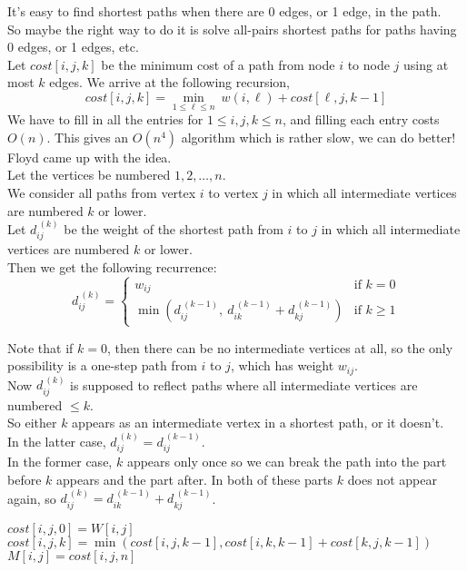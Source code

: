 \documentclass[12pt]{article}
\theoremstyle{plain}
\theoremstyle{definition}
\begin{document}
It's easy to find shortest paths when there are 0 edges, or 1 edge, in the path. \\
So maybe the right way to do it is solve all-pairs shortest paths for paths having 0 edges, or 1 edges, etc. \\
Let $cost[i, j, k]$ be the minimum cost of a path from node $i$ to node $j$ using at most $k$ edges.
We arrive at the following recursion,
$$cost[i, j, k] = \underset{1 \leq \ell \leq n}{\min} ~ w(i, \ell) + cost[\ell, j, k - 1]$$
We have to fill in all the entries for $1 \leq i, j, k \leq n$, and filling each entry costs $O(n)$.
This gives an $O(n^{4})$ algorithm which is rather slow, we can do better! \\

Floyd came up with the idea. \\
Let the vertices be numbered $1, 2, \dots, n$. \\
We consider all paths from vertex $i$ to vertex $j$ in which all intermediate vertices are numbered $k$ or lower. \\
Let $d_{ij}^{~(k)}$ be the weight of the shortest path from $i$ to $j$ in which all intermediate vertices are numbered $k$ or lower. \\

Then we get the following recurrence:
$$
d_{ij}^{~(k)} =
\begin{cases}
  w_{ij} & \text{if } k = 0 \\
  \min(d_{ij}^{~(k-1)},~d_{ik}^{~(k-1)} + d_{kj}^{~(k-1)}) & \text{if } k \geq 1
\end{cases}
$$

Note that if $k = 0$, then there can be no intermediate vertices at all, so the only possibility is a one-step path from $i$ to $j$, which has weight $w_{ij}$. \\

Now $d_{ij}^{~(k)}$ is supposed to reflect paths where all intermediate vertices are numbered $\leq k$. \\
So either $k$ appears as an intermediate vertex in a shortest path, or it doesn't. \\
In the latter case, $d_{ij}^{~(k)} = d_{ij}^{~(k-1)}$. \\
In the former case, $k$ appears only once so we can break the path into the part before $k$ appears and the part after.
In both of these parts $k$ does not appear again, so $d_{ij}^{~(k)} = d_{ik}^{~(k-1)} + d_{kj}^{~(k-1)}$. \\

\begin{algorithmic}
      \State $cost[i, j, 0] = W[i, j]$
    \EndFor
  \EndFor
        \State $cost[i, j, k] = \min(cost[i, j, k-1], cost[i, k, k-1] + cost[k, j, k-1])$
      \EndFor
    \EndFor
  \EndFor
      \State $M[i, j] = cost[i, j, n]$
    \EndFor
  \EndFor
  \State {}
\EndFunction
\end{algorithmic}
\end{document}

